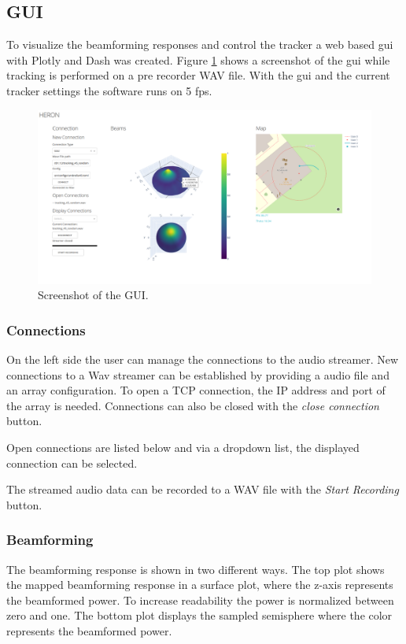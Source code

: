 \subsection{GUI}
To visualize the beamforming responses and control the tracker a web based \acrshort{gui} with
Plotly and Dash was created.
Figure \ref{fin:fig:gui} shows a screenshot of the \acrshort{gui} while tracking is performed
on a pre recorder WAV file.
With the \acrshort{gui} and the current tracker settings the software runs on 5 \acrshort{fps}.
\begin{figure}
	\centering
	\includegraphics[width=14.2cm]{images/6_design_final/gui.png}
	\caption{Screenshot of the GUI.}
	\label{fin:fig:gui}
\end{figure}

\subsubsection{Connections}
On the left side the user can manage the connections to the audio streamer.
New connections to a Wav streamer can be established by providing a audio file
and an array configuration. To open a TCP connection, the IP address and port
of the array is needed.
Connections can also be closed with the \textit{close connection} button.

Open connections are listed below and via a dropdown list,
the displayed connection can be selected.

The streamed audio data can be recorded to a WAV file with the \textit{Start Recording}
button.

\subsubsection{Beamforming}
The beamforming response is shown in two different ways.
The top plot shows the mapped beamforming response in a surface plot, where
the z-axis represents the beamformed power.
To increase readability the power is normalized between zero and one.
The bottom plot displays the sampled semisphere where the color
represents the beamformed power.

